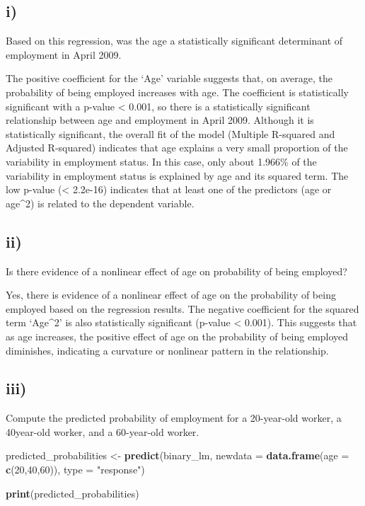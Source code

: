 \documentclass[
]{article}
\newenvironment{Shaded}{\begin{snugshade}}{\end{snugshade}}
\newcommand{\AttributeTok}[1]{\textcolor[rgb]{0.13,0.29,0.53}{#1}}
\newcommand{\DecValTok}[1]{\textcolor[rgb]{0.00,0.00,0.81}{#1}}
\newcommand{\FunctionTok}[1]{\textcolor[rgb]{0.13,0.29,0.53}{\textbf{#1}}}
\newcommand{\NormalTok}[1]{#1}
\newcommand{\OtherTok}[1]{\textcolor[rgb]{0.56,0.35,0.01}{#1}}
\newcommand{\StringTok}[1]{\textcolor[rgb]{0.31,0.60,0.02}{#1}}
\begin{document}
\hypertarget{i}{%
\subsection{i)}\label{i}}

Based on this regression, was the age a statistically significant
determinant of employment in April 2009. \vspace{1em}

The positive coefficient for the `Age' variable suggests that, on
average, the probability of being employed increases with age. The
coefficient is statistically significant with a p-value \textless{}
0.001, so there is a statistically significant relationship between age
and employment in April 2009. Although it is statistically significant,
the overall fit of the model (Multiple R-squared and Adjusted R-squared)
indicates that age explains a very small proportion of the variability
in employment status. In this case, only about 1.966\% of the
variability in employment status is explained by age and its squared
term. The low p-value (\textless{} 2.2e-16) indicates that at least one
of the predictors (age or age\^{}2) is related to the dependent
variable.

\hypertarget{ii}{%
\subsection{ii)}\label{ii}}

Is there evidence of a nonlinear effect of age on probability of being
employed? \vspace{1em}

Yes, there is evidence of a nonlinear effect of age on the probability
of being employed based on the regression results. The negative
coefficient for the squared term `Age\^{}2' is also statistically
significant (p-value \textless{} 0.001). This suggests that as age
increases, the positive effect of age on the probability of being
employed diminishes, indicating a curvature or nonlinear pattern in the
relationship.

\hypertarget{iii}{%
\subsection{iii)}\label{iii}}

Compute the predicted probability of employment for a 20-year-old
worker, a 40year-old worker, and a 60-year-old worker.

\begin{Shaded}
\begin{Highlighting}[]
\NormalTok{predicted\_probabilities }\OtherTok{\textless{}{-}} \FunctionTok{predict}\NormalTok{(binary\_lm, }
                                   \AttributeTok{newdata =} \FunctionTok{data.frame}\NormalTok{(}\AttributeTok{age =} \FunctionTok{c}\NormalTok{(}\DecValTok{20}\NormalTok{,}\DecValTok{40}\NormalTok{,}\DecValTok{60}\NormalTok{)), }
                                   \AttributeTok{type =} \StringTok{"response"}\NormalTok{)}

\FunctionTok{print}\NormalTok{(predicted\_probabilities)}
\end{Highlighting}
\end{Shaded}
\end{document}
